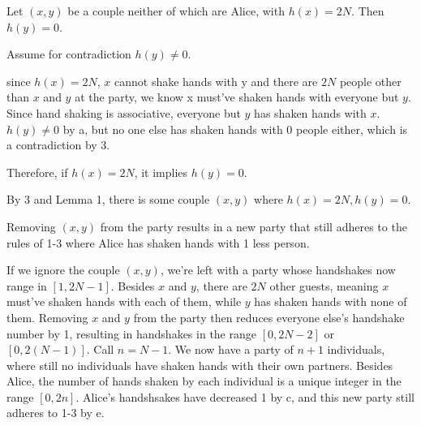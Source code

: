 \documentclass[11pt]{article}
\begin{document}
\begin{enumerate}
\begin{enumerate}
\begin{longFormProof}
             \begin{lemma}
               Let $(x,y)$ be a couple neither of which are Alice, with $h(x)=2N$.  Then $h(y)=0$.
             \end{lemma}
       
             \begin{longFormProof}
               \begin{block}[blockL]
                  {Assume for contradiction $h(y) \neq 0$.}

                  \step since $h(x) = 2N$, $x$ cannot shake hands with y and there are $2N$ 
                        people other than $x$ and $y$ at the party, we know x must’ve shaken 
                        hands with everyone but $y$.
                  \step Since hand shaking is associative, everyone but $y$ has shaken hands with $x$.
                  \step $h(y) \neq 0$ by a, but no one else has shaken hands with 0 people 
                        either, which is a contradiction by 3.
               \end{block}
                \step Therefore, if $h(x) = 2N$, it implies $h(y) = 0$.
             \end{longFormProof}
       
       \vspace*{-1em}
       \hrulefill
       \smallskip
       
       \step By 3 and Lemma 1, there is some couple $(x,y)$ where $h(x)=2N, h(y)=0$.

      \smallskip
       \hrulefill
       \smallskip
       
             \begin{lemma}
               Removing $(x,y)$ from the party results in a new party that still adheres to the rules of 1-3 where Alice has shaken hands with 1 less person.
             \end{lemma}
       
             \begin{longFormProof}
                \step If we ignore the couple $(x,y)$, we're left with a party whose 
                      handshakes now range in $[1,2N-1]$.
                \step Besides $x$ and $y$, there are $2N$ other guests, meaning $x$ 
                      must've shaken hands with each of them, while $y$ has shaken 
                      hands with none of them.
                \step Removing $x$ and $y$ from the party then reduces everyone else's handshake 
                      number by 1, resulting in handshakes in the range $[0, 2N-2]$ or $[0, 2(N-1)]$.
                \step Call $n = N-1$.
                \step We now have a party of $n+1$ individuals, where still no individuals have 
                      shaken hands with their own partners. Besides Alice, the number of hands 
                      shaken by each individual is a unique integer in the range $[0,2n]$.
                \step Alice's handshsakes have decreased 1 by c, and this new party still 
                      adheres to 1-3 by e.
             \end{longFormProof}
       

\end{longFormProof}
\end{enumerate}
\end{enumerate}
\end{document}
